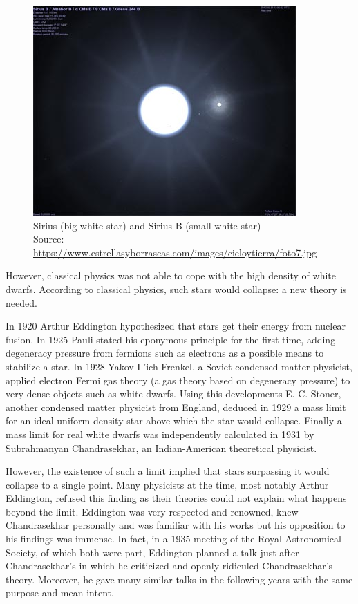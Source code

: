 \documentclass[a4paper]{article}
\begin{document}
\begin{figure}
    \centering
    \includegraphics[width=0.5\linewidth]{images/sirius.jpg}
    \caption{\centering Sirius (big white star) and Sirius B (small white star)\\ Source: \url{https://www.estrellasyborrascas.com/images/cieloytierra/foto7.jpg}}
    \label{fig:sirius}
\end{figure}

However, classical physics was not able to cope with the high density of white dwarfs. According to classical physics, such stars would collapse: a new theory is needed.

In 1920 Arthur Eddington hypothesized that stars get their energy from nuclear fusion. In 1925 Pauli stated his eponymous principle for the first time, adding degeneracy pressure from fermions such as electrons as a possible means to stabilize a star. In 1928 Yakov Il'ich Frenkel, a Soviet condensed matter physicist, applied electron Fermi gas theory (a gas theory based on degeneracy pressure) to very dense objects such as white dwarfs. Using this developments E. C. Stoner, another condensed matter physicist from England, deduced in 1929 a mass limit for an ideal uniform density star above which the star would collapse. Finally a mass limit for real white dwarfs was independently calculated in 1931 by Subrahmanyan Chandrasekhar, an Indian-American theoretical physicist.

However, the existence of such a limit implied that stars surpassing it would collapse to a single point. Many physicists at the time, most notably Arthur Eddington, refused this finding as their theories could not explain what happens beyond the limit. Eddington  was very respected and renowned, knew Chandrasekhar personally and was familiar with his works but his opposition to his findings was immense. In fact, in a 1935 meeting of the Royal Astronomical Society, of which both were part, Eddington planned a talk just after Chandrasekhar's in which he criticized and openly ridiculed Chandrasekhar's theory. Moreover, he gave many similar talks in the following years with the same purpose and mean intent.
\end{document}
